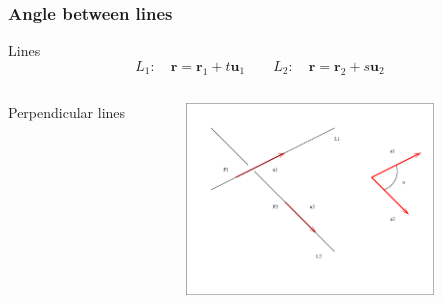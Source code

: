 \begin{frame}
\frametitle{Angle between lines}
Lines
    $$L_1: \quad \textbf{r}= \textbf{r}_1+t\textbf{u}_1 \qquad L_2: \quad \textbf{r}= \textbf{r}_2+s\textbf{u}_2$$

  \begin{columns}[t]
    \column[T]{6cm}
    \textcolor[rgb]{0.98,0.00,0.00}{Perpendicular} lines\\
    \column{6.5cm}
    \begin{figure}
        \includegraphics[height=2in]{../images/ok-angle_line_line.eps}
    \end{figure}
  \end{columns}
\end{frame}

